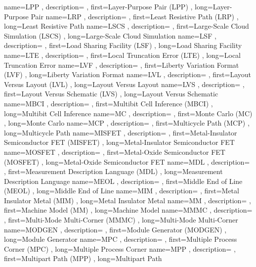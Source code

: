 { name={LPP}
, description={}
, first={Layer-Purpose Pair (LPP)}
, long={Layer-Purpose Pair}
}
{ name={LRP}
, description={}
, first={Least Resistive Path (LRP)}
, long={Least Resistive Path}
}
{ name={LSCS}
, description={}
, first={Large-Scale Cloud Simulation (LSCS)}
, long={Large-Scale Cloud Simulation}
}
{ name={LSF}
, description={}
, first={Load Sharing Facility (LSF)}
, long={Load Sharing Facility}
}
{ name={LTE}
, description={}
, first={Local Truncation Error (LTE)}
, long={Local Truncation Error}
}
{ name={LVF}
, description={}
, first={Liberty Variation Format (LVF)}
, long={Liberty Variation Format}
}
{ name={LVL}
, description={}
, first={Layout Versus Layout (LVL)}
, long={Layout Versus Layout}
}
{ name={LVS}
, description={}
, first={Layout Versus Schematic (LVS)}
, long={Layout Versus Schematic}
}
{ name={MBCI}
, description={}
, first={Multibit Cell Inference (MBCI)}
, long={Multibit Cell Inference}
}
{ name={MC}
, description={}
, first={Monte Carlo (MC)}
, long={Monte Carlo}
}
{ name={MCP}
, description={}
, first={Multicycle Path (MCP)}
, long={Multicycle Path}
}
{ name={MISFET}
, description={}
, first={Metal-Insulator Semiconductor FET (MISFET)}
, long={Metal-Insulator Semiconductor FET}
}
{ name={MOSFET}
, description={}
, first={Metal-Oxide Semiconductor FET (MOSFET)}
, long={Metal-Oxide Semiconductor FET}
}
{ name={MDL}
, description={}
, first={Measurement Description Language (MDL)}
, long={Measurement Description Language}
}
{ name={MEOL}
, description={}
, first={Middle End of Line (MEOL)}
, long={Middle End of Line}
}
{ name={MIM}
, description={}
, first={Metal Insulator Metal (MIM)}
, long={Metal Insulator Metal}
}
{ name={MM}
, description={}
, first={Machine Model (MM)}
, long={Machine Model}
}
{ name={MMMC}
, description={}
, first={Multi-Mode Multi-Corner (MMMC)}
, long={Multi-Mode Multi-Corner}
}
{ name={MODGEN}
, description={}
, first={Module Generator (MODGEN)}
, long={Module Generator}
}
{ name={MPC}
, description={}
, first={Multiple Process Corner (MPC)}
, long={Multiple Process Corner}
}
{ name={MPP}
, description={}
, first={Multipart Path (MPP)}
, long={Multipart Path}
}

